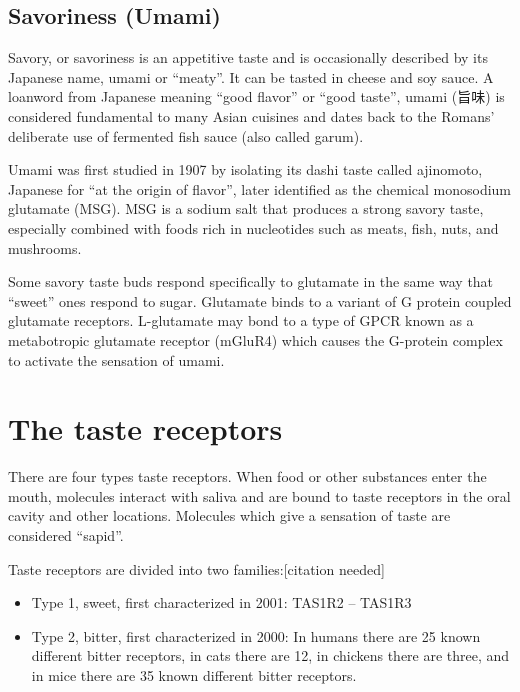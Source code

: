 \hypertarget{savoriness-umami}{%
\subsection{Savoriness (Umami)}\label{savoriness-umami}}

Savory, or savoriness is an appetitive taste and is occasionally described by its Japanese name, umami or ``meaty''. It can be tasted in cheese and soy sauce. A loanword from Japanese meaning ``good flavor'' or ``good taste'', umami (旨味) is considered fundamental to many Asian cuisines and dates back to the Romans' deliberate use of fermented fish sauce (also called garum).

Umami was first studied in 1907 by isolating its dashi taste called ajinomoto, Japanese for ``at the origin of flavor'', later identified as the chemical monosodium glutamate (MSG). MSG is a sodium salt that produces a strong savory taste, especially combined with foods rich in nucleotides such as meats, fish, nuts, and mushrooms.

Some savory taste buds respond specifically to glutamate in the same way that ``sweet'' ones respond to sugar. Glutamate binds to a variant of G protein coupled glutamate receptors. L-glutamate may bond to a type of GPCR known as a metabotropic glutamate receptor (mGluR4) which causes the G-protein complex to activate the sensation of umami.

\hypertarget{the-taste-receptors}{%
\section{The taste receptors}\label{the-taste-receptors}}

There are four types taste receptors. When food or other substances enter the mouth, molecules interact with saliva and are bound to taste receptors in the oral cavity and other locations. Molecules which give a sensation of taste are considered ``sapid''.

Taste receptors are divided into two families:{[}citation needed{]}

\begin{itemize}
\tightlist
\item
  Type 1, sweet, first characterized in 2001: TAS1R2 -- TAS1R3
\item
  Type 2, bitter, first characterized in 2000: In humans there are 25 known different bitter receptors, in cats there are 12, in chickens there are three, and in mice there are 35 known different bitter receptors.
\end{itemize}

